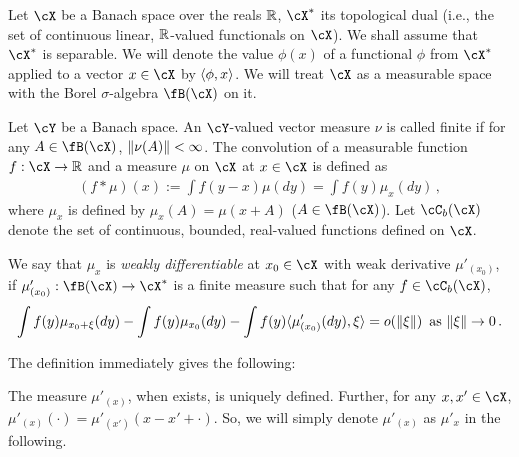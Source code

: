 \documentclass[11pt,letterpaper,english]{article}
\newcommand{\Borel}{\fB}
\newcommand{\Cb}{\cC_b}
\begin{document}
Let $\cX$ be a Banach space over the reals $\mathbb{R}$, 
$\cX^*$ its topological dual (i.e., the set of continuous linear, $\mathbb{R}$-valued functionals on $\cX$). 
We shall assume that $\cX^*$ is separable. 
We will denote the value $\phi(x)$ of a functional $\phi$ from $\cX^*$ applied to a vector $x\in \cX$ by $\langle \phi,x \rangle$.
We will treat $\cX$ as a measurable space with the Borel $\sigma$-algebra $\Borel(\cX)$ on it. 

Let $\cY$ be a Banach space.
An $\cY$-valued vector measure $\nu$ is called finite if for any $A\in \Borel(\cX)$, $\|\nu(A)\|<\infty$.
The convolution of a measurable function  $f: \cX \to \R$  and a measure $\mu$ on $\cX$ at $x\in \cX$ is defined as
\begin{align*}
\left( f*\mu \right) (x) := \int f(y-x)\mu (d y)
 = \int f(y)\mu_x(dy)\,,
\end{align*}
where $\mu_x$ is defined by $\mu_x(A) = \mu(x+A)$ ($A\in \Borel(\cX)$). 
Let $\Cb(\cX)$ denote the set of continuous, bounded, real-valued functions defined on $\cX$.
\begin{definition}
We say that $\mu_x$ is \emph{weakly differentiable} 
at $x_0\in \cX$ with weak derivative $\mu'_{(x_0)}$, if 
 $\mu'_{(x_0)}: \Borel(\cX)\to \cX^*$ is a finite measure such that for any $f \in \Cb(\cX)$,
\begin{align*}
\int f(y)\mu_{x_0+\xi}(dy) - \int f(y)\mu_{x_0}(dy)
-\int f(y)\langle \mu'_{(x_0)}(dy), \xi \rangle = o(\|\xi\|) \,\text{ as } \|\xi\|\to 0\,.
\end{align*}
\end{definition}
The definition immediately gives the following:
\begin{proposition}
The measure $\mu'_{(x)}$, when exists, is uniquely defined.
Further, for any $x,x'\in \cX$,  $\mu'_{(x)}(\cdot) = \mu'_{(x')}(x-x'+\cdot)$. So, we will simply denote $\mu'_{(x)}$ as $\mu'_{x}$ in the following.
\end{proposition}
\end{document}
